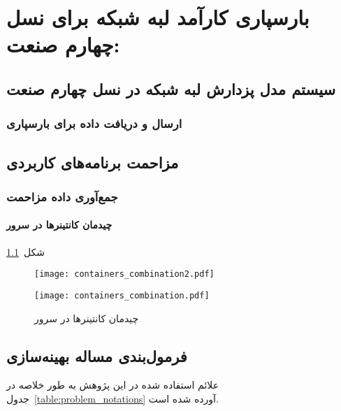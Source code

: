 
\chapter{بارسپاری کارآمد لبه شبکه برای نسل چهارم صنعت:}\label{chap:model}

\section{سیستم مدل پزدارش لبه شبکه در نسل چهارم صنعت}

\subsection{ارسال و دریافت داده برای بارسپاری}

\section{مزاحمت برنامه‌های کاربردی}
\label{subsec:interference_model}

\subsection{جمع‌آوری داده مزاحمت}

\subsubsection{چیدمان کانتینرها در سرور}

شکل~\ref{figure:containers_combination}

\vspace{0.5cm}
\begin{figure}[h]
\begin{minipage}{0.45\textwidth}
\centering
\texttt{[image: containers\_combination2.pdf]}
\end{minipage}\hfill
\begin{minipage}{0.45\textwidth}
\centering
\texttt{[image: containers\_combination.pdf]}
\end{minipage}\hfill
\caption{چیدمان کانتینرها در سرور}
\label{figure:containers_combination}
\end{figure}
\vspace{0.5cm}

\section{فرمول‌بندی مساله بهینه‌سازی}

علائم استفاده شده در این پژوهش به طور خلاصه در جدول~\ref{table:problem_notations} آورده شده است.

